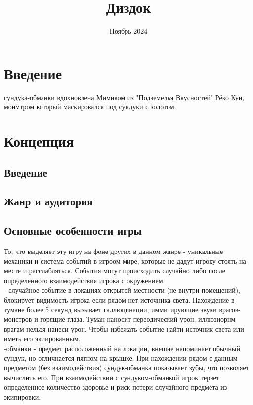 \documentclass{article}
\title{Диздок}
\author{}
\date{Ноябрь 2024}
\begin{document}
\maketitle

\tableofcontents

\section{Введение}
 сундука-обманки вдохновлена Мимиком из "Подземелья Вкусностей" Рёко Куи, монмтром который маскировался под сундуки с золотом.

\section{Концепция}

\subsection{Введение}

\subsection{Жанр и аудитория}

\subsection{Основные особенности игры}
\par То, что выделяет эту игру на фоне других в данном жанре - уникальные механики и система событий в игроом мире, которые не дадут игроку стоять на месте и расслабляться. События могут происходить случайно либо после определенного взаимодействия игрока с окружением. \\[2mm]  - случайное событие в локациях открытой местности (не внутри помещений), блокирует видимость игрока если рядом нет источника света. Нахождение в тумане более 5 секунд вызывает галлюцинации, иммитирующие звуки врагов-монстров и горящие глаза. Туман наносит переодический урон, иллюзиорнм врагам нельзя нанеси урон. Чтобы избежать событие найти источник света или иметь его экиированным. \\[2mm] -обманки - предмет расположенный на локации, внешне напоминает обычный сундук, но отличнается пятном на крышке. При нахождении рядом с данным предметом (без взаимодействия) сундук-обманка показывает зубы, что позволяет вычислить его. При взаимодействии с сундуком-обманкой игрок теряет определенное количество здоровье и риск потери случайного предмета из экипировки. \\[2mm] 
\end{document}
